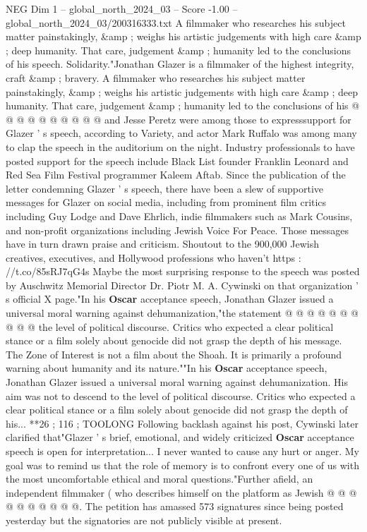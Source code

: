 \begin{textsample}{NEG Dim 1 – global\_north\_2024\_03 – Score -1.00 – global\_north\_2024\_03/200316333.txt}
A filmmaker who researches his subject matter painstakingly, \&amp ; weighs his artistic judgements with high care \&amp ; deep humanity.
That care, judgement \&amp ; humanity led to the conclusions of his speech.
Solidarity."Jonathan Glazer is a filmmaker of the highest integrity, craft \&amp ; bravery.
A filmmaker who researches his subject matter painstakingly, \&amp ; weighs his artistic judgements with high care \&amp ; deep humanity.
That care, judgement \&amp ; humanity led to the conclusions of his @ @ @ @ @ @ @ @ @ @ and Jesse Peretz were among those to expresssupport for Glazer ' s speech, according to Variety, and actor Mark Ruffalo was among many to clap the speech in the auditorium on the night.
Industry professionals to have posted support for the speech include Black List founder Franklin Leonard and Red Sea Film Festival programmer Kaleem Aftab.
Since the publication of the letter condemning Glazer ' s speech, there have been a slew of supportive messages for Glazer on social media, including from prominent film critics including Guy Lodge and Dave Ehrlich, indie filmmakers such as Mark Cousins, and non-profit organizations including Jewish Voice For Peace.
Those messages have in turn drawn praise and criticism.
Shoutout to the 900,000 Jewish creatives, executives, and Hollywood professions who haven't https : //t.co/85sRJ7qG4s Maybe the most surprising response to the speech was posted by Auschwitz Memorial Director Dr.
Piotr M.
A.
Cywinski on that organization ' s official X page."In his \textbf{Oscar} acceptance speech, Jonathan Glazer issued a universal moral warning against dehumanization,"the statement @ @ @ @ @ @ @ @ @ @ the level of political discourse.
Critics who expected a clear political stance or a film solely about genocide did not grasp the depth of his message.
The Zone of Interest is not a film about the Shoah.
It is primarily a profound warning about humanity and its nature.""In his \textbf{Oscar} acceptance speech, Jonathan Glazer issued a universal moral warning against dehumanization.
His aim was not to descend to the level of political discourse.
Critics who expected a clear political stance or a film solely about genocide did not grasp the depth of his... **26 ; 116 ; TOOLONG Following backlash against his post, Cywinski later clarified that"Glazer ' s brief, emotional, and widely criticized \textbf{Oscar} acceptance speech is open for interpretation...
I never wanted to cause any hurt or anger.
My goal was to remind us that the role of memory is to confront every one of us with the most uncomfortable ethical and moral questions."Further afield, an independent filmmaker ( who describes himself on the platform as Jewish @ @ @ @ @ @ @ @ @ @.
The petition has amassed 573 signatures since being posted yesterday but the signatories are not publicly visible at present.

\end{textsample}
